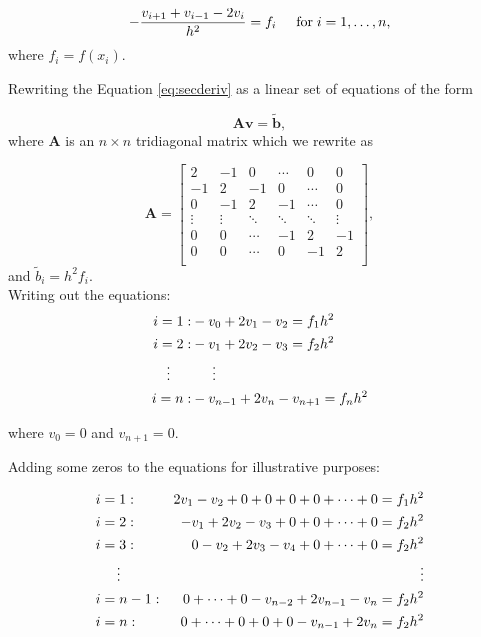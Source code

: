 
\begin{equation}\label{eq:secderiv}
   -\frac{v_{i+1}+v_{i-1}-2v_i}{h^2} = f_i  \hspace{0.5cm} \mathrm{for} \hspace{0.1cm} i=1,\dots, n,
\end{equation}
where $f_i=f(x_i)$.

Rewriting the Equation \ref{eq:secderiv} as a linear set of equations of the form

\begin{equation*}
   \mathbf{A}\mathbf{v} = \tilde{\mathbf{b}},
\end{equation*}
where $\mathbf{A}$ is an $n\times n$  tridiagonal matrix which we rewrite as

\[
    \mathbf{A} = \begin{bmatrix}
    	2& -1& 0 &\cdots & 0 &0 \\
        -1 & 2 & -1 &0 &\cdots &0 \\
        0&-1 &2 & -1 & \cdots & 0 \\
        \vdots& \vdots & \ddots &\ddots &\ddots & \vdots \\
        0&0 & \cdots &-1 &2& -1 \\
        0&0 & \cdots & 0  &-1 & 2 \\
        \end{bmatrix},
\]
and $\tilde{b}_i=h^2f_i$.\\

Writing out the equations:
\begin{align*}
i = 1: &-v_0+2v_1-v_2 = f_1 h^2\\
i = 2: &-v_1+2v_2-v_3 = f_2 h^2\\
\vdots \indent &\indent \vdots\\
i = n: &-v_{n-1}+2v_n-v_{n+1} = f_n h^2\\
\end{align*}

where $v_0 = 0$ and $v_{n+1} = 0$.

Adding some zeros to the equations for illustrative purposes:

\begin{align*}
&i = 1:  &2v_1-v_2 + 0 + 0 + 0 +0 + \cdots + 0 = f_1 h^2\\
&i = 2: &-v_1+2v_2-v_3 +0 + 0 + \cdots + 0 = f_2 h^2\\
&i = 3:  &0 -v_2+2v_3-v_4 + 0 + \cdots + 0 = f_2 h^2\\
&\indent\vdots &\indent \indent \vdots\\
&i = n-1: &0 + \cdots+ 0 -v_{n-2}+2v_{n-1} - v_n= f_2 h^2\\
&i = n: &0 + \cdots + 0 + 0 + 0 -v_{n-1}+2v_n= f_2 h^2\\
\end{align*}

